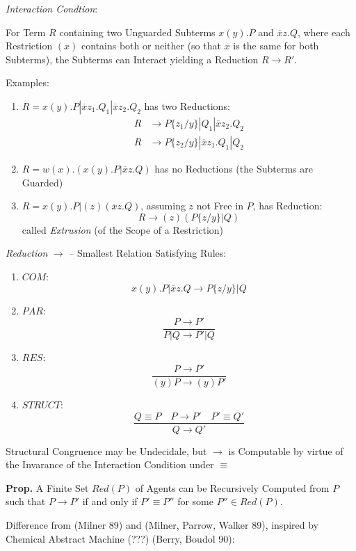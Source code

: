 \emph{Interaction Condtion}:

For Term $R$ containing two Unguarded Subterms $x(y).P$ and
$\overline{x}z.Q$, where each Restriction $(x)$ contains both or
neither (so that $x$ is the same for both Subterms), the Subterms can
Interact yielding a Reduction $R \rightarrow R'$.

Examples:
\begin{enumerate}
  \item $R = x(y).P | \overline{x}z_1.Q_1 | \overline{x}z_2.Q_2$ has
    two Reductions:
    \begin{align*}
      R &\rightarrow P\{z_1/y\} | Q_1 | \overline{x}z_2.Q_2 \\
      R &\rightarrow P\{z_2/y\} | \overline{x}z_1.Q_1 | Q_2
    \end{align*}
  \item $R = w(x).(x(y).P | \overline{x}z.Q)$ has no Reductions (the
    Subterms are Guarded)
  \item $R = x(y).P | (z)(\overline{x}z.Q)$,
    assuming $z$ not Free in $P$, has Reduction:
    \[
      R \rightarrow (z)(P\{z/y\} | Q)
    \]
    called \emph{Extrusion} (of the Scope of a Restriction)
\end{enumerate}

\emph{Reduction} $\rightarrow$ -- Smallest Relation Satisfying Rules:
\begin{enumerate}
  \item $COM$:
  \[
    x(y).P | \overline{x}z.Q \rightarrow P\{z/y\} | Q
  \]
  \item $PAR$:
  \[
    \frac{P \rightarrow P'}
    {P|Q \rightarrow P'|Q}
  \]
  \item $RES$:
  \[
    \frac{P \rightarrow P'}
    {(y)P \rightarrow (y)P'}
  \]
  \item $STRUCT$:
  \[
    \frac{Q \equiv P \quad P \rightarrow P' \quad P' \equiv Q'}
    {Q \rightarrow Q'}
  \]
\end{enumerate}

Structural Congruence may be Undecidale, but $\rightarrow$ is
Computable by virtue of the Invarance of the Interaction Condition
under $\equiv$

\textbf{Prop.} A Finite Set $Red(P)$ of Agents can be Recursively
Computed from $P$ such that $P \rightarrow P'$ if and only if $P'
\equiv P''$ for some $P'' \in Red(P)$.

Difference from (Milner 89) and (Milner, Parrow, Walker 89), inspired
by Chemical Abstract Machine (???) (Berry, Boudol 90):

